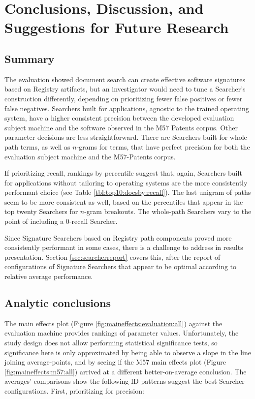 \documentclass[11pt]{ucthesis}
\theoremstyle{plain}
\theoremstyle{definition}
\begin{document}
\chapter{Conclusions, Discussion, and Suggestions for Future Research}


\section{Summary}

The evaluation showed document search can create effective software signatures based on Registry artifacts, but an investigator would need to tune a Searcher's construction differently, depending on prioritizing fewer false positives or fewer false negatives.  Searchers built for applications, agnostic to the trained operating system, have a higher consistent precision between the developed evaluation subject machine and the software observed in the M57 Patents corpus.  Other parameter decisions are less straightforward.  There are Searchers built for whole-path terms, as well as $n$-grams for terms, that have perfect precision for both the evaluation subject machine and the M57-Patents corpus.

If prioritizing recall, rankings by percentile suggest that, again, Searchers built for applications without tailoring to operating systems are the more consistently performant choice (see Table \ref{tbl:top10:docsby:recall}).  The last unigram of paths seem to be more consistent as well, based on the percentiles that appear in the top twenty Searchers for $n$-gram breakouts.  The whole-path Searchers vary to the point of including a 0-recall Searcher.

Since Signature Searchers based on Registry path components proved more consistently performant in some cases, there is a challenge to address in results presentation.  Section \ref{sec:searcherreport} covers this, after the report of configurations of Signature Searchers that appear to be optimal according to relative average performance.


\section{Analytic conclusions}

The main effects plot (Figure \ref{fig:maineffects:evaluation:all}) against the evaluation machine provides rankings of parameter values.  Unfortunately, the study design does not allow performing statistical significance tests, so significance here is only approximated by being able to observe a slope in the line joining average-points, and by seeing if the M57 main effects plot (Figure \ref {fig:maineffects:m57:all}) arrived at a different better-on-average conclusion.  The averages' comparisons show the following ID patterns suggest the best Searcher configurations.  First, prioritizing for precision:
\end{document}
